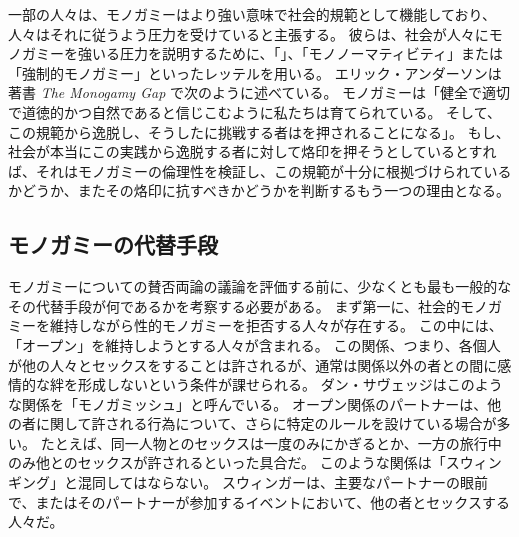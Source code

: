 \documentclass[paper=a4,book,openany]{jlreq}
\newcommand{\ig}[1]{}           %
\begin{document}
一部の人々は、モノガミーはより強い意味で社会的規範として機能しており、人々はそれに従うよう圧力を受けていると主張する。
彼らは、社会が人々にモノガミーを強いる圧力を説明するために、「」、「モノノーマティビティ」または「強制的モノガミー」といったレッテルを用いる\citep[p.277]{emens04:_monog_law}。
エリック・アンダーソン\ig{Eric Anderson}は著書 \emph{The Monogamy Gap} で次のように述べている。
モノガミーは「健全で適切で道徳的かつ自然であると信じこむように私たちは育てられている。
そして、この規範から逸脱し、そうしたに挑戦する者はを押されることになる」\citep{anderson11:_monog_gap}。
もし、社会が本当にこの実践から逸脱する者に対して烙印を押そうとしているとすれば、それはモノガミーの倫理性を検証し、この規範が十分に根拠づけられているかどうか、またその烙印に抗すべきかどうかを判断するもう一つの理由となる。

\subsection{モノガミーの代替手段}

モノガミーについての賛否両論の議論を評価する前に、少なくとも最も一般的なその代替手段が何であるかを考察する必要がある。
まず第一に、社会的モノガミーを維持しながら性的モノガミーを拒否する人々が存在する。
この中には、「オープン」を維持しようとする人々が含まれる。
この関係、つまり、各個人が他の人々とセックスをすることは許されるが、通常は関係以外の者との間に感情的な絆を形成しないという条件が課せられる。
ダン・サヴェッジはこのような関係を「モノガミッシュ」と呼んでいる\citep{savage12:_savag_monogamish}。
オープン関係のパートナーは、他の者に関して許される行為について、さらに特定のルールを設けている場合が多い。
たとえば、同一人物とのセックスは一度のみにかぎるとか、一方の旅行中のみ他とのセックスが許されるといった具合だ。
このような関係は「スウィンギング」と混同してはならない。
スウィンガーは、主要なパートナーの眼前で、またはそのパートナーが参加するイベントにおいて、他の者とセックスする人々だ。
\end{document}
